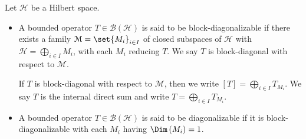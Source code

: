 \documentclass[10pt]{mypackage}
\begin{document}
\begin{definition}
  Let $\mathcal{H}$ be a Hilbert space.
  \begin{itemize}
    \item A bounded operator $T\in \mathcal{B}\left(\mathcal{H}\right)$ is said to be block-diagonalizable if there exists a family $\mathcal{M} = \set{M_i}_{i\in I}$ of closed subspaces of $\mathcal{H}$ with $\mathcal{H} = \bigoplus_{i\in I}M_i$, with each $M_i$ reducing $T$. We say $T$ is block-diagonal with respect to $\mathcal{M}$.\newline

      If $T$ is block-diagonal with respect to $\mathcal{M}$, then we write $\left[T\right] = \bigoplus_{i\in I}T_{M_i}$. We say $T$ is the internal direct sum and write $T = \bigoplus_{i\in I}T_{M_i}$.
    \item A bounded operator $T\in \mathcal{B}\left(\mathcal{H}\right)$ is said to be diagonalizable if it is block-diagonalizable with each $M_i$ having $\Dim\left(M_i\right) = 1$.
  \end{itemize}
\end{definition}
\end{document}
